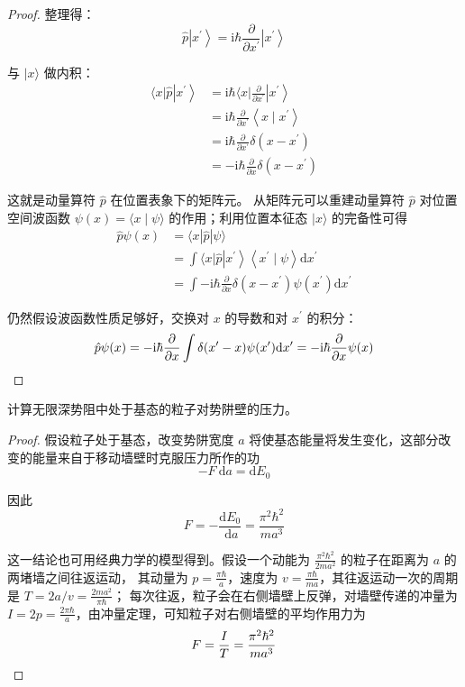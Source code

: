 \begin{proof}
整理得：
$$\hat{p}\left|x^{\prime}\right\rangle
=\mathrm{i} \hbar \frac{\partial}{\partial x^{\prime}}\left|x^{\prime}\right\rangle$$

与 $|x\rangle$ 做内积：
$$
\begin{aligned}
\langle x| \hat{p}\left|x^{\prime}\right\rangle & =\mathrm{i} \hbar\langle x| \frac{\partial}{\partial x^{\prime}}\left|x^{\prime}\right\rangle \\
& =\mathrm{i} \hbar \frac{\partial}{\partial x^{\prime}}\left\langle x \mid x^{\prime}\right\rangle \\
& =\mathrm{i} \hbar \frac{\partial}{\partial x^{\prime}} \delta(x-x^{\prime}) \\
& =-\mathrm{i} \hbar \frac{\partial}{\partial x} \delta(x-x^{\prime})
\end{aligned}
$$

这就是动量算符 $\hat{p}$ 在位置表象下的矩阵元。
从矩阵元可以重建动量算符 $\hat{p}$ 对位置空间波函数 $\psi(x)=\langle x \mid \psi\rangle$ 的作用；利用位置本征态 $|x\rangle$ 的完备性可得
$$
\begin{aligned}
\hat{p} \psi(x) & =\langle x| \hat{p}|\psi\rangle \\
& =\int\langle x| \hat{p}\left|x^{\prime}\right\rangle\left\langle x^{\prime} \mid \psi\right\rangle \mathrm{d} x^{\prime} \\
& =\int-\mathrm{i} \hbar \frac{\partial}{\partial x} \delta(x-x^{\prime}) \psi(x^{\prime}) \mathrm{d} x^{\prime}
\end{aligned}
$$

仍然假设波函数性质足够好，交换对 $x$ 的导数和对 $x^{\prime}$ 的积分：
$$\hat{p} \psi(x)=-\mathrm{i} \hbar \frac{\partial}{\partial x} \int \delta(x^{\prime}-x) \psi(x^{\prime}) \mathrm{d} x^{\prime}
=-\mathrm{i} \hbar \frac{\partial}{\partial x} \psi(x)\qedhere$$
\end{proof}
\begin{2}
   计算无限深势阻中处于基态的粒子对势阱壁的压力。 
\end{2}
\begin{proof}
    假设粒子处于基态，改变势阱宽度 $a$ 将使基态能量将发生变化，这部分改变的能量来自于移动墙壁时克服压力所作的功
$$-F \mathrm{~d} a=\mathrm{d} E_{0}$$

因此
$$F=-\frac{\mathrm{d} E_{0}}{\mathrm{~d} a}=\frac{\pi^{2} \hbar^{2}}{m a^{3}}$$

这一结论也可用经典力学的模型得到。假设一个动能为 $\frac{\pi^{2} \hbar^{2}}{2m a^{2}}$ 的粒子在距离为 $a$ 的两堵墙之间往返运动，
其动量为 $p=\frac{\pi \hbar}{a}$，速度为 $v=\frac{\pi \hbar}{m a}$，其往返运动一次的周期是 $T=2a/v=\frac{2m a^{2}}{\pi \hbar}$；
每次往返，粒子会在右侧墙壁上反弹，对墙壁传递的冲量为 $I=2 p=\frac{2 \pi \hbar}{a}$，由冲量定理，可知粒子对右侧墙壁的平均作用力为
$$F=\frac{I}{T}=\frac{ \pi^{2} \hbar^{2}}{m a^{3}}\qedhere$$
\end{proof}
